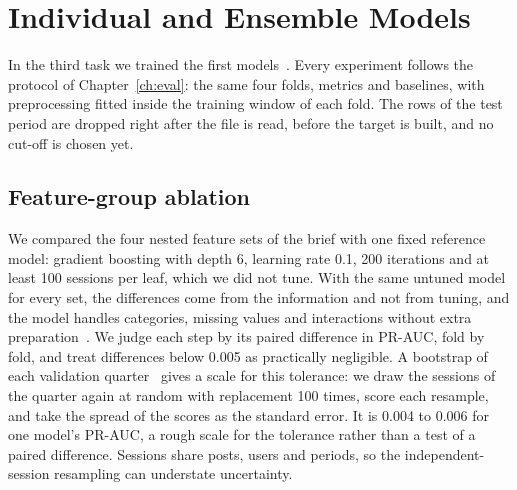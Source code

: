 \documentclass[12pt,a4paper,openany]{report}
\begin{document}
\chapter{Individual and Ensemble Models}\label{ch:models}

In the third task we trained the first models~\cite{brief}. Every experiment follows the protocol of Chapter~\ref{ch:eval}:
the same four folds, metrics and baselines, with preprocessing fitted inside the training window of each
fold. The rows of the test period are dropped right after the file is read, before the target is built, and no
cut-off is chosen yet.

\section{Feature-group ablation}\label{sec:ablation}

We compared the four nested feature sets of the brief with one fixed reference model: gradient boosting with depth
6, learning rate 0.1, 200 iterations and at least 100 sessions per leaf, which we did not tune. With the same
untuned model for every set, the differences come from the information and not from tuning, and the model handles
categories, missing values and interactions without extra preparation~\cite{sklearn}. We judge each step by its paired
difference in \acs{PR-AUC}, fold by fold, and treat differences below 0.005 as practically negligible. A
bootstrap of each validation quarter~\cite{mindd04} gives a scale for this tolerance: we draw the sessions of the
quarter again at random with replacement 100 times, score each resample, and take the spread of the scores as the
standard error. It is 0.004 to 0.006 for one model's \acs{PR-AUC}, a rough scale for the tolerance rather than a
test of a paired difference. Sessions share posts, users and periods, so the independent-session resampling can
understate uncertainty.
\end{document}
